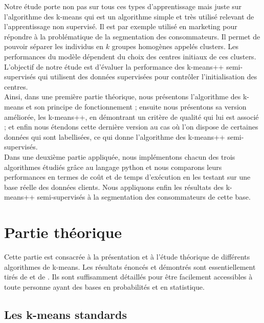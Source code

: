 \documentclass[12pt,a4paper]{book}
\newcommand{\1}{\mathds{1}}
\begin{document}
Notre étude porte non pas sur tous ces types d'apprentissage mais juste sur l'algorithme des k-means qui est un algorithme simple et très utilisé relevant de l'apprentissage non supervisé. Il est par exemple utilisé en marketing pour répondre à la problématique de la segmentation des consommateurs. Il permet de pouvoir séparer les individus en $k$ groupes homogènes appelés clusters. Les performances du modèle dépendent du choix des centres initiaux de ces clusters.  L'objectif de notre étude est d'évaluer la performance des k-means++ semi-supervisés qui utilisent des données supervisées pour contrôler l'initialisation des centres. \\
Ainsi, dans une première partie théorique, nous présentons l'algorithme des k-means et son principe de fonctionnement ; ensuite nous présentons sa version améliorée, les k-means++, en démontrant un critère de qualité qui lui est associé ; et enfin nous étendons cette dernière version au cas où l'on dispose de certaines données qui sont labellisées, ce qui donne l'algorithme des k-means++ semi-supervisés.\\ 
Dans une deuxième partie appliquée, nous implémentons chacun des trois algorithmes étudiés grâce au langage python et nous comparons leurs performances en termes de coût et de temps d'exécution en  les testant sur une base réelle des données clients. Nous appliquons enfin les résultats des k-means++ semi-supervisés à la segmentation des consommateurs de cette base.





\section{Partie théorique}

Cette partie est consacrée à la présentation et à l'étude théorique de différents algorithmes de k-means. Les  résultats énoncés et démontrés sont essentiellement tirés de \cite{DAV2007} et de \cite{JOR2017}. Ils sont suffisamment détaillés pour être facilement accessibles à toute personne ayant des bases en probabilités et en statistique.

\subsection{Les k-means standards}
\end{document}
